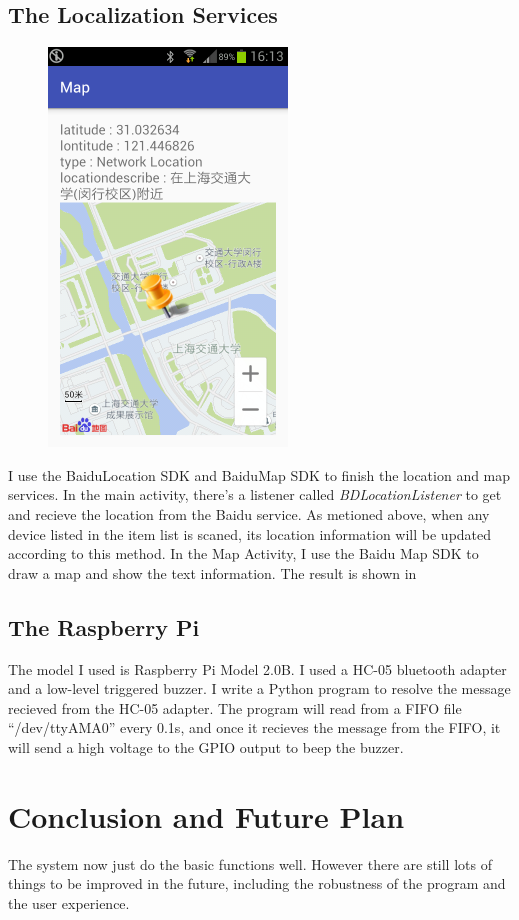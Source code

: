 \documentclass{article}
\begin{document}
\subsection{The Localization Services}
\begin{figure}[htbp]
\label{fig:7}
\centering
\includegraphics[width =180pt ,keepaspectratio ]{8.png}
\end{figure}
I use the BaiduLocation SDK and BaiduMap SDK to finish the location and map services. In the main activity, there's a listener called \emph{BDLocationListener} to get and recieve the location from the Baidu service. As metioned above, when any device listed in the item list is scaned, its location information will be updated according to this method. In the Map Activity, I use the Baidu Map SDK to draw a map and show the text information. The result is shown in 
\subsection{The Raspberry Pi}
The model I used is Raspberry Pi Model 2.0B. I used a HC-05 bluetooth adapter and a low-level triggered buzzer. I write a Python program to resolve the message recieved from the HC-05 adapter. The program will read from a FIFO file “/dev/ttyAMA0'' every 0.1s, and once it recieves the message from the FIFO, it will send a high voltage to the GPIO output to beep the buzzer. 
\section{Conclusion and Future Plan}
The system now just do the basic functions well. However there are still lots of things to be improved in the future, including the robustness of the program and the user experience.
\end{document}
